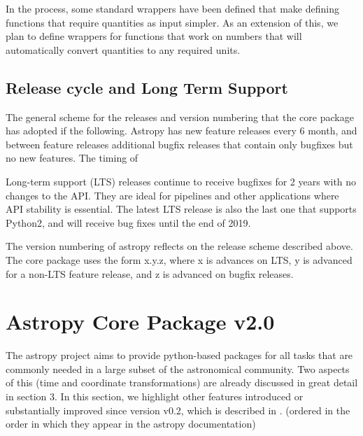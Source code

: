 \documentclass[modern]{aastex61}
\begin{document}
In the process, some standard wrappers have been defined that make defining functions that require quantities as input simpler. As an extension of this, we plan to define wrappers for functions that work on numbers that will automatically convert quantities to any required units.

\subsection{Release cycle and Long Term Support}
%
\par The general scheme for the releases and version numbering that the core
package has adopted if the following. Astropy has new feature releases every
6 month, and between feature releases additional bugfix releases that
contain only bugfixes but no new features. The timing of
%
\par Long-term support (LTS) releases continue to receive bugfixes for 2
years with no changes to the API. They are ideal for pipelines and other
applications where API stability is essential. The latest LTS release is
also the last one that supports Python2, and will receive bug fixes until the
end of 2019.
%
\par The version numbering of astropy reflects on the release scheme
described above. The core package uses the form x.y.z, where x is advances
on LTS, y is advanced for a non-LTS feature release, and z is advanced on
bugfix releases.


\section{Astropy Core Package v2.0}

The astropy project aims to provide python-based packages for all tasks that are commonly needed in a large subset of the astronomical community. Two aspects of this (time and coordinate transformations) are already discussed in great detail in section 3. In this section, we highlight other features introduced or substantially improved since version v0.2, which is described in \citet{2013A&A...558A..33A}.
(ordered in the order in which they appear in the astropy documentation)
\end{document}
